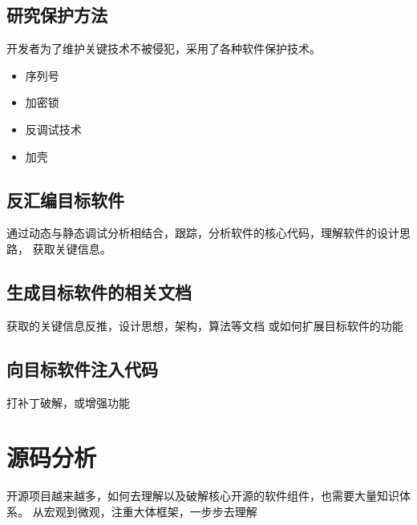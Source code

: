 \subsection{研究保护方法}
开发者为了维护关键技术不被侵犯，采用了各种软件保护技术。
\begin{itemize}
    \item {序列号}
    \item {加密锁}
    \item {反调试技术}
    \item {加壳}
\end{itemize}

\subsection{反汇编目标软件}
通过动态与静态调试分析相结合，跟踪，分析软件的核心代码，理解软件的设计思路，
获取关键信息。

\subsection{生成目标软件的相关文档}
获取的关键信息反推，设计思想，架构，算法等文档
或如何扩展目标软件的功能

\subsection{向目标软件注入代码}
打补丁破解，或增强功能


\section{源码分析}
开源项目越来越多，如何去理解以及破解核心开源的软件组件，也需要大量知识体系。
从宏观到微观，注重大体框架，一步步去理解
